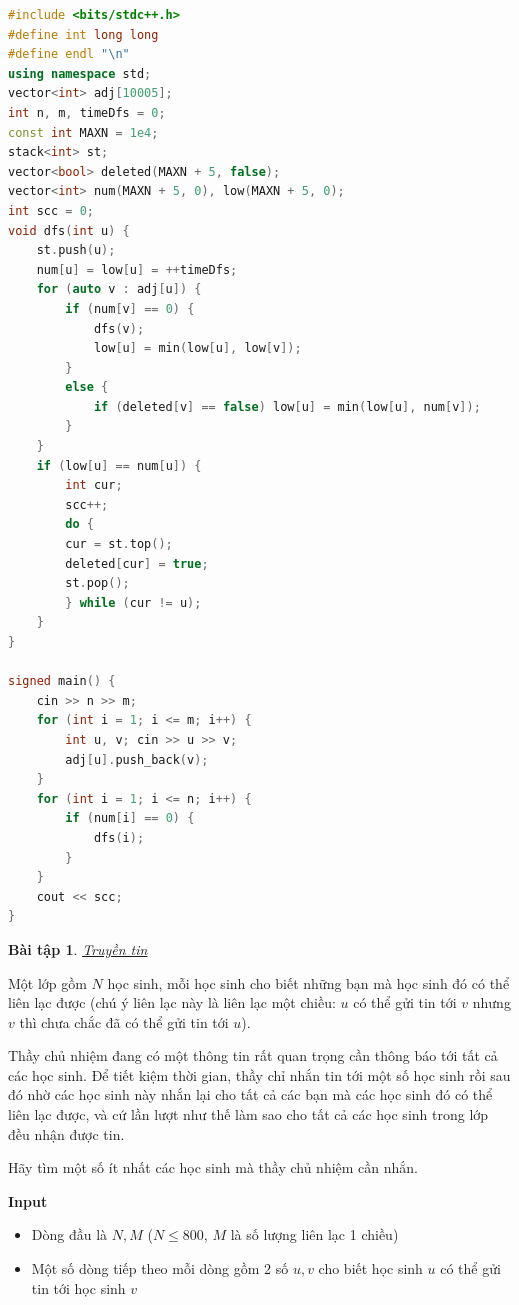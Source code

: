 \documentclass{article}
\newtheorem{baitap}{Bài tập}
\begin{document}
\begin{lstlisting}[language=C++]
#include <bits/stdc++.h>
#define int long long
#define endl "\n"
using namespace std;
vector<int> adj[10005];
int n, m, timeDfs = 0;
const int MAXN = 1e4;
stack<int> st;
vector<bool> deleted(MAXN + 5, false);
vector<int> num(MAXN + 5, 0), low(MAXN + 5, 0);
int scc = 0;
void dfs(int u) {
    st.push(u);
    num[u] = low[u] = ++timeDfs;
    for (auto v : adj[u]) {
        if (num[v] == 0) {
            dfs(v);
            low[u] = min(low[u], low[v]);
        }
        else {
            if (deleted[v] == false) low[u] = min(low[u], num[v]);
        }
    }
    if (low[u] == num[u]) {
        int cur;
        scc++;
        do {
        cur = st.top();
        deleted[cur] = true;
        st.pop();
        } while (cur != u);
    }
}

signed main() {
    cin >> n >> m;
    for (int i = 1; i <= m; i++) {
        int u, v; cin >> u >> v;
        adj[u].push_back(v);
    }    
    for (int i = 1; i <= n; i++) {
        if (num[i] == 0) {
            dfs(i);
        }
    }
    cout << scc;
}
\end{lstlisting}

\begin{baitap}
    \href{https://oj.vnoi.info/problem/message}{Truyền tin}
\end{baitap}

Một lớp gồm $N$ học sinh, mỗi học sinh cho biết những bạn mà học sinh đó có thể liên lạc được (chú ý liên lạc này là liên lạc một chiều: $u$ có thể gửi tin tới $v$ nhưng $v$ thì chưa chắc đã có thể gửi tin tới $u$).

Thầy chủ nhiệm đang có một thông tin rất quan trọng cần thông báo tới tất cả các học sinh. Để tiết kiệm thời gian, thầy chỉ nhắn tin tới một số học sinh rồi sau đó nhờ các học sinh này nhắn lại cho tất cả các bạn mà các học sinh đó có thể liên lạc được, và cứ lần lượt như thế làm sao cho tất cả các học sinh trong lớp đều nhận được tin.

Hãy tìm một số ít nhất các học sinh mà thầy chủ nhiệm cần nhắn.

\textbf{Input}
\begin{itemize}
    \item Dòng đầu là $N, M$ ($N \leq 800$, $M$ là số lượng liên lạc 1 chiều)
    \item Một số dòng tiếp theo mỗi dòng gồm 2 số $u, v$ cho biết học sinh $u$ có thể gửi tin tới học sinh $v$
\end{itemize}
\end{document}
